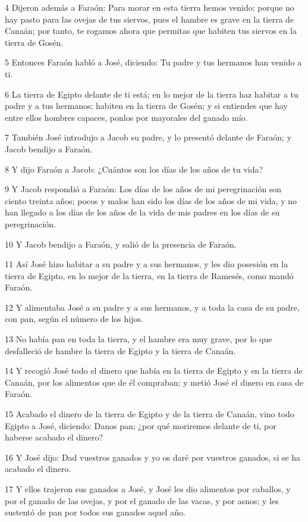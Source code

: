 4 Dijeron además a Faraón: Para morar en esta tierra hemos venido; porque no hay pasto para las ovejas de tus siervos, pues el hambre es grave en la tierra de Canaán; por tanto, te rogamos ahora que permitas que habiten tus siervos en la tierra de Gosén.

5 Entonces Faraón habló a José, diciendo: Tu padre y tus hermanos han venido a ti.

6 La tierra de Egipto delante de ti está; en lo mejor de la tierra haz habitar a tu padre y a tus hermanos; habiten en la tierra de Gosén; y si entiendes que hay entre ellos hombres capaces, ponlos por mayorales del ganado mío.

7 También José introdujo a Jacob su padre, y lo presentó delante de Faraón; y Jacob bendijo a Faraón.

8 Y dijo Faraón a Jacob: ¿Cuántos son los días de los años de tu vida?

9 Y Jacob respondió a Faraón: Los días de los años de mi peregrinación son ciento treinta años; pocos y malos han sido los días de los años de mi vida, y no han llegado a los días de los años de la vida de mis padres en los días de su peregrinación.

10 Y Jacob bendijo a Faraón, y salió de la presencia de Faraón.

11 Así José hizo habitar a su padre y a sus hermanos, y les dio posesión en la tierra de Egipto, en lo mejor de la tierra, en la tierra de Ramesés, como mandó Faraón.

12 Y alimentaba José a su padre y a sus hermanos, y a toda la casa de su padre, con pan, según el número de los hijos.

13 No había pan en toda la tierra, y el hambre era muy grave, por lo que desfalleció de hambre la tierra de Egipto y la tierra de Canaán.

14 Y recogió José todo el dinero que había en la tierra de Egipto y en la tierra de Canaán, por los alimentos que de él compraban; y metió José el dinero en casa de Faraón.

15 Acabado el dinero de la tierra de Egipto y de la tierra de Canaán, vino todo Egipto a José, diciendo: Danos pan; ¿por qué moriremos delante de ti, por haberse acabado el dinero?

16 Y José dijo: Dad vuestros ganados y yo os daré por vuestros ganados, si se ha acabado el dinero.

17 Y ellos trajeron sus ganados a José, y José les dio alimentos por caballos, y por el ganado de las ovejas, y por el ganado de las vacas, y por asnos; y les sustentó de pan por todos sus ganados aquel año.

